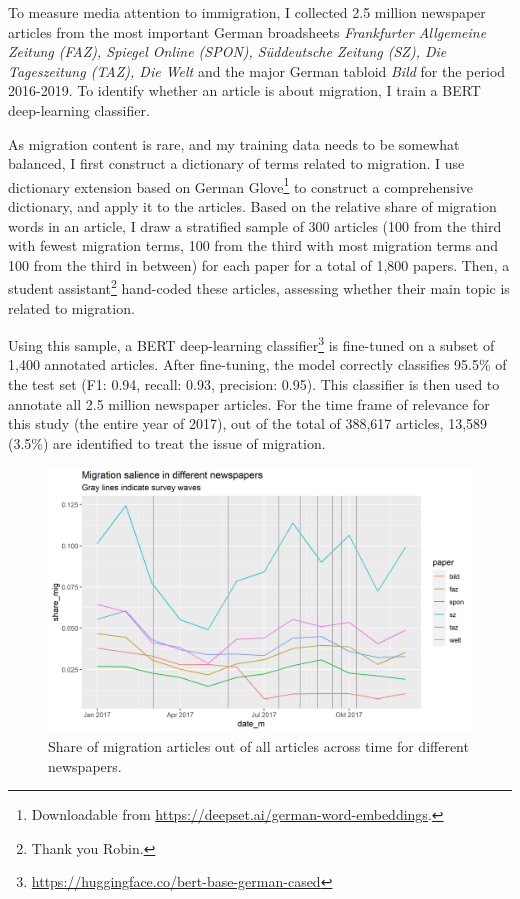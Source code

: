 \documentclass{article}
\begin{document}
To measure media attention to immigration, I collected 2.5 million newspaper articles from the most important German broadsheets \textit{Frankfurter Allgemeine Zeitung (FAZ), Spiegel Online (SPON), Süddeutsche Zeitung (SZ), Die Tageszeitung (TAZ), Die Welt} and the major German tabloid \textit{Bild} for the period 2016-2019. To identify whether an article is about migration, I train a BERT deep-learning classifier. 

As migration content is rare, and my training data needs to be somewhat balanced, I first construct a dictionary of terms related to migration. I use dictionary extension based on German Glove\footnote{Downloadable from \url{https://deepset.ai/german-word-embeddings}.} to construct a comprehensive dictionary, and apply it to the articles. Based on the relative share of migration words in an article, I draw a stratified sample of 300 articles (100 from the third with fewest migration terms, 100 from the third with most migration terms and 100 from the third in between) for each paper for a total of 1,800 papers. Then, a student assistant\footnote{Thank you Robin.} hand-coded these articles, assessing whether their main topic is related to migration. 

Using this sample, a BERT deep-learning classifier\footnote{\url{https://huggingface.co/bert-base-german-cased}} is fine-tuned on a subset of 1,400 annotated articles. After fine-tuning, the model correctly classifies 95.5\% of the test set (F1: 0.94, recall: 0.93, precision: 0.95). This classifier is then used to annotate all 2.5 million newspaper articles. For the time frame of relevance for this study (the entire year of 2017), out of the total of 388,617 articles, 13,589 (3.5\%) are identified to treat the issue of migration.

\begin{figure}[!ht]
    \centering
    \includegraphics[width=\textwidth]{paper/vis/salience_papers_focus.png}
    \caption{Share of migration articles out of all articles across time for different newspapers.}
    \label{fig:salience}
\end{figure}
\end{document}
